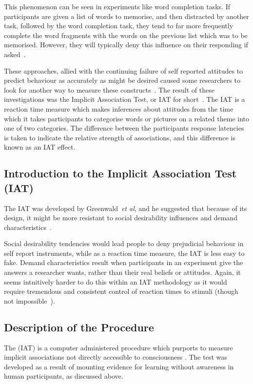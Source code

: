 This phenomenon can be seen in  experiments like word completion tasks. If participants are given a list of words to memorise, and then distracted by another task, followed by the word completion task, they tend to far more frequently complete the word fragments with the words on the previous list which was to be memorised.  However, they will typically deny this influence on their responding if asked~\cite{Wittenbrink2007a}. 

These approaches, allied with the continuing failure of self reported attitudes to predict behaviour as accurately as might be desired caused some researchers to look for another way to measure these constructs~\cite{Greenwald1995a}. The result of these investigations was the Implicit Association Test, or IAT for short~\cite{Greenwald1998}. The IAT is a reaction time measure which makes inferences about attitudes from the time which it takes participants to categorise words or pictures on a related theme into one of two categories. The difference between the participants response latencies is taken to indicate the relative strength of associations, and this difference is known as an IAT effect.  


\subsection{Introduction to the Implicit Association Test (IAT)}
\label{sec:intr-impl-assoc}

The IAT was developed by Greenwald~\textit{et al}, and he suggested that because of its design, it might be more resistant to social desirability influences and demand characteristics~\cite{Greenwald1998}. 

Social desirability tendencies would lead people to deny prejudicial behaviour in self report instruments, while as a reaction time measure, the IAT is less easy to fake. Demand characteristics result when participants in an experiment give the answers a researcher wants, rather than their real beliefs or attitudes. Again, it seems intuitively harder to do this within an IAT methodology as it would require tremendous and consistent control of reaction times to stimuli (though not impossible~\cite{DeHouwer2007b}). 

\subsection{Description of the Procedure}
\label{sec:descr-proc}

The (IAT) is a computer administered procedure which purports to measure implicit associations not directly accessible to consciousness \cite{Greenwald1998}. The test was developed as a result of mounting evidence for learning without awareness in human participants, as discussed above. 

